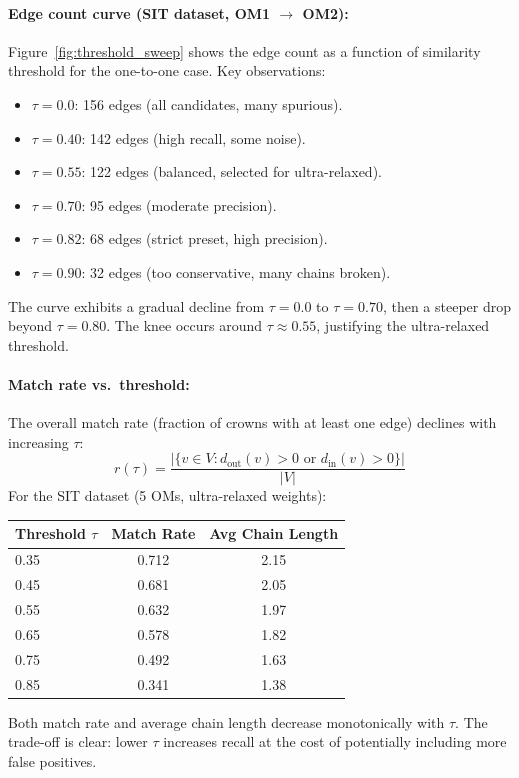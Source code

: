 \paragraph{Edge count curve (SIT dataset, OM1 $\to$ OM2):}
Figure~\ref{fig:threshold_sweep} shows the edge count as a function of similarity threshold for the one-to-one case. Key observations:
\begin{itemize}
    \item $\tau = 0.0$: 156 edges (all candidates, many spurious).
    \item $\tau = 0.40$: 142 edges (high recall, some noise).
    \item $\tau = 0.55$: 122 edges (balanced, selected for ultra-relaxed).
    \item $\tau = 0.70$: 95 edges (moderate precision).
    \item $\tau = 0.82$: 68 edges (strict preset, high precision).
    \item $\tau = 0.90$: 32 edges (too conservative, many chains broken).
\end{itemize}
The curve exhibits a gradual decline from $\tau = 0.0$ to $\tau = 0.70$, then a steeper drop beyond $\tau = 0.80$. The knee occurs around $\tau \approx 0.55$, justifying the ultra-relaxed threshold.

\paragraph{Match rate vs.\ threshold:}
The overall match rate (fraction of crowns with at least one edge) declines with increasing $\tau$:
\[
r(\tau) = \frac{|\{v \in V : d_{\text{out}}(v) > 0 \text{ or } d_{\text{in}}(v) > 0\}|}{|V|}
\]
For the SIT dataset (5 OMs, ultra-relaxed weights):
\begin{center}
\begin{tabular}{lcc}
\toprule
Threshold $\tau$ & Match Rate & Avg Chain Length \\
\midrule
0.35 & 0.712 & 2.15 \\
0.45 & 0.681 & 2.05 \\
0.55 & 0.632 & 1.97 \\
0.65 & 0.578 & 1.82 \\
0.75 & 0.492 & 1.63 \\
0.85 & 0.341 & 1.38 \\
\bottomrule
\end{tabular}
\end{center}
Both match rate and average chain length decrease monotonically with $\tau$. The trade-off is clear: lower $\tau$ increases recall at the cost of potentially including more false positives.

